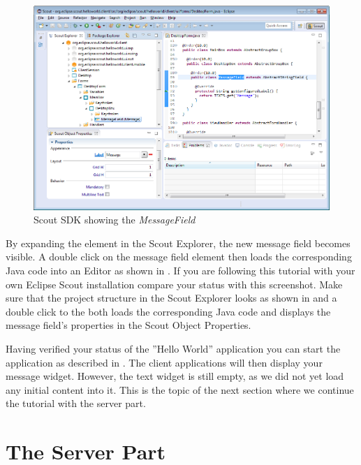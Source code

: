 \documentclass[a4paper,10pt,twoside]{book}
\begin{document}
\begin{figure}
\includegraphics[width=15cm]{sdk_helloworld_messagefield.png}
\caption{Scout SDK showing the \it{MessageField}}
\end{figure}

By expanding the  element in the Scout Explorer, the new message field becomes visible. 
A double click on the message field element then loads the corresponding Java code into an Editor as shown in .
If you are following this tutorial with your own Eclipse Scout installation compare your status with this screenshot.
Make sure that the project structure in the Scout Explorer looks as shown in  and a double click to the  both loads the corresponding Java code and displays the message field's properties in the Scout Object Properties.

Having verified your status of the ''Hello World'' application you can start the application as described in .
The client applications will then display your message widget.
However, the text widget is still empty, as we did not yet load any initial content into it.
This is the topic of the next section where we continue the tutorial with the server part.

\section{The Server Part}
\end{document}
